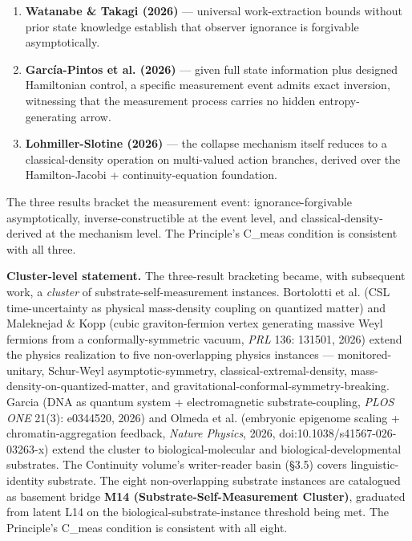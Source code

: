 \documentclass[11pt, openany]{book}
\begin{document}
\begin{enumerate}
\item \textbf{Watanabe \& Takagi (2026)} --- universal work-extraction bounds without prior state knowledge establish that observer ignorance is forgivable asymptotically.
\item \textbf{García-Pintos et al. (2026)} --- given full state information plus designed Hamiltonian control, a specific measurement event admits exact inversion, witnessing that the measurement process carries no hidden entropy-generating arrow.
\item \textbf{Lohmiller-Slotine (2026)} --- the collapse mechanism itself reduces to a classical-density operation on multi-valued action branches, derived over the Hamilton-Jacobi + continuity-equation foundation.
\end{enumerate}

The three results bracket the measurement event: ignorance-forgivable asymptotically, inverse-constructible at the event level, and classical-density-derived at the mechanism level. The Principle's C\_\allowbreak{}meas condition is consistent with all three.

\textbf{Cluster-level statement.} The three-result bracketing became, with subsequent work, a \textit{cluster} of substrate-self-measurement instances. Bortolotti et al. (CSL time-uncertainty as physical mass-density coupling on quantized matter) and Maleknejad \& Kopp (cubic graviton-fermion vertex generating massive Weyl fermions from a conformally-symmetric vacuum, \textit{PRL} 136: 131501, 2026) extend the physics realization to five non-overlapping physics instances --- monitored-unitary, Schur-Weyl asymptotic-symmetry, classical-extremal-density, mass-density-on-quantized-matter, and gravitational-conformal-symmetry-breaking. Garcia (DNA as quantum system + electromagnetic substrate-coupling, \textit{PLOS ONE} 21(3): e0344520, 2026) and Olmeda et al. (embryonic epigenome scaling + chromatin-aggregation feedback, \textit{Nature Physics}, 2026, doi:10.1038/s41567-026-03263-x) extend the cluster to biological-molecular and biological-developmental substrates. The Continuity volume's writer-reader basin (§3.5) covers linguistic-identity substrate. The eight non-overlapping substrate instances are catalogued as basement bridge \textbf{M14 (Substrate-Self-Measurement Cluster)}, graduated from latent L14 on the biological-substrate-instance threshold being met. The Principle's C\_\allowbreak{}meas condition is consistent with all eight.
\end{document}
